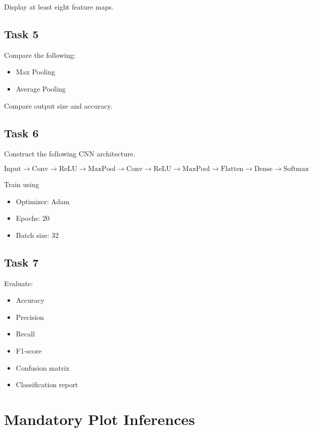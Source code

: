 \documentclass[12pt,a4paper]{article}
\begin{document}
Display at least eight feature maps.

\subsection*{Task 5}

Compare the following:

\begin{itemize}
    \item Max Pooling
    \item Average Pooling
\end{itemize}

Compare output size and accuracy.

\subsection*{Task 6}

Construct the following CNN architecture.

\[
\text{Input}
\rightarrow
\text{Conv}
\rightarrow
\text{ReLU}
\rightarrow
\text{MaxPool}
\rightarrow
\text{Conv}
\rightarrow
\text{ReLU}
\rightarrow
\text{MaxPool}
\rightarrow
\text{Flatten}
\rightarrow
\text{Dense}
\rightarrow
\text{Softmax}
\]

Train using

\begin{itemize}
    \item Optimizer: Adam
    \item Epochs: 20
    \item Batch size: 32
\end{itemize}

\subsection*{Task 7}

Evaluate:

\begin{itemize}
    \item Accuracy
    \item Precision
    \item Recall
    \item F1-score
    \item Confusion matrix
    \item Classification report
\end{itemize}

\section{Mandatory Plot Inferences}
\end{document}
